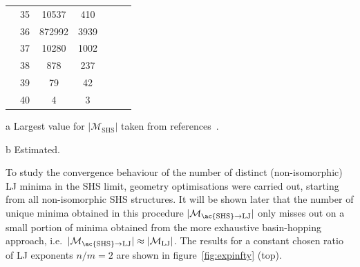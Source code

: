 \begin{table}[htbp]
{\begin{threeparttable}[para]
\begin{tabular}{clccccc}
       & 35  & 10537  				& 410  &                       &                       &                     \\
       & 36  & 872992 				& 3939 &                       &                       &                     \\
       & 37  & 10280  				& 1002 &                       &                       &                     \\
       & 38  & 878    				& 237  &                       &                       &                     \\
       & 39  & 79     				& 42   &                       &                       &                     \\
       & 40  & 4      				& 3    &                       &                       &                     \\\bottomrule
        \end{tabular}
            \begin{tablenotes}
            \item[a]{Largest value for $|\mathcal{M}_\mathrm{SHS}|$ taken from references~\cite{Holmes-Cerfon_EnumeratingRigidSphere_2016,Hoy_Structurefinitesphere_2012,Hoy_Structuredynamicsmodel_2015}.} \item[b]{Estimated.}
            \end{tablenotes}
        \end{threeparttable}}
    \end{table}%
%
To study the convergence behaviour of the number of distinct (non-isomorphic)
\ac{LJ} minima in the \ac{SHS} limit, geometry optimisations were carried out,
starting from all non-isomorphic \ac{SHS} structures. It will be shown later
that the number of unique minima obtained in this procedure
$|\mathcal{M}_\mathrm{\ac{SHS}\to LJ}|$ only misses out on a small portion of
minima obtained from the more exhaustive basin-hopping approach,
i.e.~$|\mathcal{M}_\mathrm{\ac{SHS}\to LJ}|\approx|\mathcal{M}_\mathrm{LJ}|$.
The results for a constant chosen ratio of \ac{LJ} exponents $n/m=2$ are shown
in figure~\ref{fig:expinfty} (top).
%
